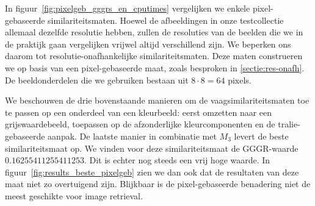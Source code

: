 In figuur~\ref{fig:pixelgeb_gggrs_en_cputimes} vergelijken we enkele pixel-gebaseerde similariteitsmaten.
Hoewel de afbeeldingen in onze testcollectie allemaal dezelfde resolutie hebben, zullen de
resoluties van de beelden die we in de praktijk gaan vergelijken vrijwel altijd verschillend zijn.
We beperken ons daarom tot resolutie-onafhankelijke similariteitsmaten. Deze maten construeren
we op basis van een pixel-gebaseerde maat, zoals besproken in \ref{sectie:res-onafh}. De 
beeldonderdelen die we gebruiken bestaan uit $8 \cdot 8 = 64$ pixels.

We beschouwen de drie bovenstaande manieren om de vaagsimilariteitsmaten toe te passen op een 
onderdeel van een kleurbeeld:
eerst omzetten naar een grijswaardebeeld, 
toepassen op de afzonderlijke kleurcomponenten en 
de tralie-gebaseerde aanpak.
De laatste manier in combinatie met $M_{3}$ levert de beste similariteitsmaat op. We vinden
voor deze similariteitsmaat de GGGR-waarde $0.16255411255411253$. Dit is echter nog steeds een
vrij hoge waarde. In figuur~\ref{fig:results_beste_pixelgeb}
zien we dan ook dat de resultaten van deze maat niet zo overtuigend zijn. Blijkbaar 
is de pixel-gebaseerde benadering niet de meest geschikte voor image retrieval. 

